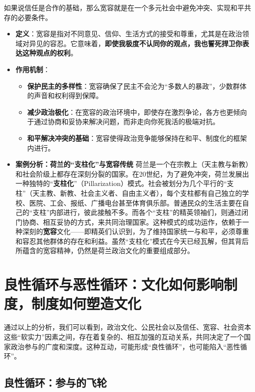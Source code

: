 如果说信任是合作的基础，那么宽容就是在一个多元社会中避免冲突、实现和平共存的必要条件。
\begin{itemize}
    \item \textbf{定义}：宽容是指对不同意见、信仰、生活方式的接受和尊重，尤其是在政治领域对异见的容忍。它意味着，\textbf{即使我极度不认同你的观点，我也誓死捍卫你表达这种观点的权利}。
    \item \textbf{作用机制}：
    \begin{itemize}
        \item \textbf{保护民主的多样性}：宽容确保了民主不会沦为“多数人的暴政”，少数群体的声音和权利得到保障。
        \item \textbf{减少政治极化}：在宽容的政治环境中，即使存在激烈争论，各方也更倾向于通过协商和妥协来解决问题，而非走向你死我活的极端对抗。
        \item \textbf{和平解决冲突的基础}：宽容使得政治竞争能够保持在和平、制度化的框架内进行。
    \end{itemize}
    \item \textbf{案例分析：荷兰的“支柱化”与宽容传统}
    荷兰是一个在宗教上（天主教与新教）和社会阶级上都存在深刻分裂的国家。在20世纪，为了避免冲突，荷兰发展出一种独特的“\textbf{支柱化}”（Pillarization）模式。社会被划分为几个平行的“支柱”（天主教、新教、社会主义者、自由主义者），每个支柱都有自己独立的学校、医院、工会、报纸、广播电台甚至体育俱乐部。普通民众的生活主要在自己的“支柱”内部进行，彼此接触不多。而各个“支柱”的精英领袖们，则通过闭门协商、相互妥协的方式，来共同治理国家。这种模式的成功运作，依赖于一种深刻的\textbf{宽容}文化——即精英们认识到，为了维持国家统一与和平，必须尊重和容忍其他群体的存在和利益。虽然“支柱化”模式在今天已经瓦解，但其背后所蕴含的宽容精神，仍然是荷兰政治文化的重要组成部分。
\end{itemize}

\hrulefill

\section{良性循环与恶性循环：文化如何影响制度，制度如何塑造文化}

通过以上的分析，我们可以看到，政治文化、公民社会以及信任、宽容、社会资本这些“软实力”因素之间，存在着复杂的、相互加强的互动关系，共同决定了一个国家政治参与的广度和深度。这种互动，可能形成“良性循环”，也可能陷入“恶性循环”。

\subsection{良性循环：参与的飞轮}

